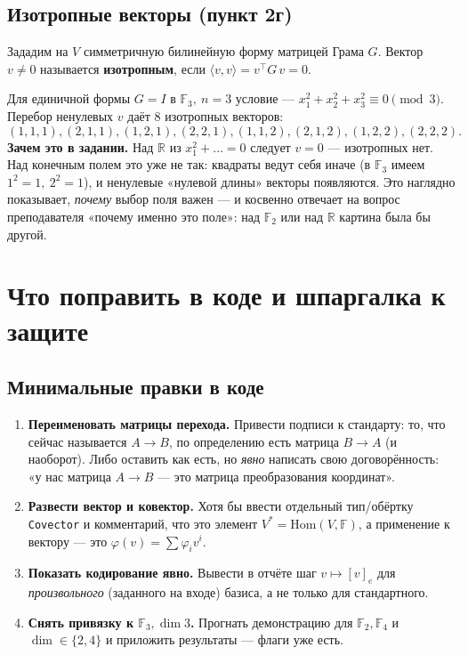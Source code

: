\documentclass[11pt]{article}
\newcommand{\F}{\mathbb{F}}
\begin{document}
\subsection{Изотропные векторы (пункт 2г)}

Зададим на $V$ симметричную билинейную форму матрицей Грама $G$. Вектор $v\neq 0$
называется \textbf{изотропным}, если $\langle v,v\rangle = v^{\top}G\,v = 0$.

Для единичной формы $G=I$ в $\F_3,\ n=3$ условие — $x_1^2+x_2^2+x_3^2\equiv 0 \pmod 3$.
Перебор ненулевых $v$ даёт $8$ изотропных векторов:
\[
(1,1,1),(2,1,1),(1,2,1),(2,2,1),(1,1,2),(2,1,2),(1,2,2),(2,2,2).
\]
\textbf{Зачем это в задании.} Над $\mathbb{R}$ из $x_1^2+\dots=0$ следует $v=0$ — изотропных
нет. Над конечным полем это уже не так: квадраты ведут себя иначе (в $\F_3$ имеем
$1^2=1,\ 2^2=1$), и ненулевые «нулевой длины» векторы появляются. Это наглядно показывает,
\emph{почему} выбор поля важен — и косвенно отвечает на вопрос преподавателя «почему именно
это поле»: над $\F_2$ или над $\mathbb{R}$ картина была бы другой.

\section{Что поправить в коде и шпаргалка к защите}
\label{sec:fix}

\subsection{Минимальные правки в коде}
\begin{enumerate}[leftmargin=1.6em]
  \item \textbf{Переименовать матрицы перехода.} Привести подписи к стандарту: то, что
        сейчас называется $A\to B$, по определению есть матрица $B\to A$ (и наоборот).
        Либо оставить как есть, но \emph{явно} написать свою договорённость:
        «у нас матрица $A\to B$ — это матрица преобразования координат».
  \item \textbf{Развести вектор и ковектор.} Хотя бы ввести отдельный тип/обёртку
        \texttt{Covector} и комментарий, что это элемент $V^{*}=\mathrm{Hom}(V,\F)$, а
        применение к вектору — это $\varphi(v)=\sum \varphi_i v^{i}$.
  \item \textbf{Показать кодирование явно.} Вывести в отчёте шаг $v\mapsto[v]_e$ для
        \emph{произвольного} (заданного на входе) базиса, а не только для стандартного.
  \item \textbf{Снять привязку к $\F_3,\dim 3$.} Прогнать демонстрацию для $\F_2,\F_4$ и
        $\dim\in\{2,4\}$ и приложить результаты — флаги уже есть.
\end{enumerate}
\end{document}

